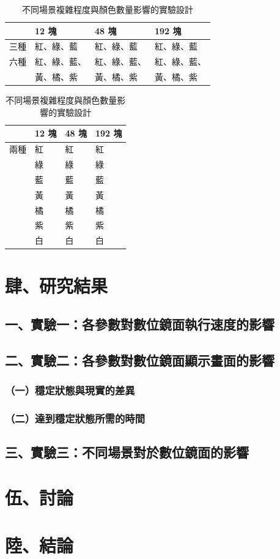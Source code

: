 \documentclass[12pt]{article}
\begin{document}
\begin{table}[h]
  \centering
  \caption{不同場景複雜程度與顏色數量影響的實驗設計}\label{table:sc3_des}
  \begin{tabular}{p{1cm}p{3cm}p{3cm}p{3cm}}
    \toprule
    & 12 塊 & 48 塊 & 192 塊 \\ 
    \midrule
    三種 & 紅、綠、藍 & 紅、綠、藍 & 紅、綠、藍 \\ 
    六種 & 紅、綠、藍、 & 紅、綠、藍、 & 紅、綠、藍、 \\ 
    & 黃、橘、紫 & 黃、橘、紫 & 黃、橘、紫 \\ 
    \bottomrule
  \end{tabular}
  \begin{tabular}{p{1cm}p{3cm}p{3cm}p{3cm}}
    \toprule
    & 12 塊 & 48 塊 & 192 塊 \\ 
    \midrule
    兩種 & 紅 & 紅 & 紅 \\ 
    & 綠 & 綠 & 綠 \\ 
    & 藍 & 藍 & 藍 \\ 
    & 黃 & 黃 & 黃 \\ 
    & 橘 & 橘 & 橘 \\ 
    & 紫 & 紫 & 紫 \\ 
    & 白 & 白 & 白 \\ 
    \bottomrule
  \end{tabular}
\end{table}

\newpage

\section{肆、研究結果}

\subsection{一、實驗一：各參數對數位鏡面執行速度的影響}

\subsection{二、實驗二：各參數對數位鏡面顯示畫面的影響}

\subsubsection{（一）穩定狀態與現實的差異}

\subsubsection{（二）達到穩定狀態所需的時間}

\subsection{三、實驗三：不同場景對於數位鏡面的影響}

\newpage
\section{伍、討論}

\newpage
\section{陸、結論}

\newpage

\printbibliography[title=柒、參考文獻資料]
\clearpage
\end{document}
